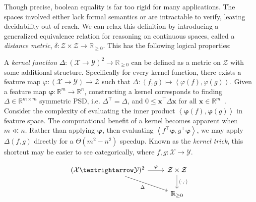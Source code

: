 \documentclass[11pt]{article}
\begin{document}
    Though precise, boolean equality is far too rigid for many applications. The spaces involved either lack formal semantics or are intractable to verify, leaving decidability out of reach. We can relax this definition by introducing a generalized equivalence relation for reasoning on continuous spaces, called a \textit{distance metric}, $δ: \mathcal{Z}\times\mathcal{Z}\rightarrow\mathbb{R}_{\geq 0}$. This has the following logical properties:


    \noindent A \textit{kernel function} $Δ: (\mathcal{X}\rightarrow\mathcal{Y})^2\rightarrow \mathbb{R}_{\geq 0}$ can be defined as a metric on $\mathcal{Z}$ with some additional structure. Specifically for every kernel function, there exists a feature map $\varphi: (\mathcal{X}→\mathcal{Y}) → \mathcal{Z}$ such that $Δ: (f, g) \mapsto \left<\varphi(f), \varphi(g)\right>$. Given a feature map $\symbf\varphi: \mathbb{R}^m → \mathbb{R}^n$, constructing a kernel corresponds to finding $\Delta \in \mathbb{R}^{m \times m}$ symmetric PSD, i.e. $\Delta^\intercal = \Delta$, and $0 \leq \mathbf{x}^\intercal \Delta \mathbf{x}$ for all $\mathbf{x} \in \mathbb{R}^m$~\cite{mercer1909functions}. Consider the complexity of evaluating the inner product $\left<\symbf\varphi(f), \symbf\varphi(g)\right>$ in feature space. The computational benefit of a kernel becomes apparent when $m \ll n$. Rather than applying $\symbf\varphi$, then evaluating $\left<f^\intercal\symbf\varphi, g^\intercal\symbf\varphi\right>$, we may apply $\Delta(f, g)$ directly for a $\Theta(m^2 - n^2)$ speedup. Known as the \textit{kernel trick}, this shortcut may be easier to see categorically, where $f, g: \mathcal{X}→\mathcal{Y}$.

    \[\begin{tikzcd}
          (\mathcal{X→\mathcal{Y}})^2 \arrow{r}{\varphi} \arrow[labels=below left]{dr}{\Delta} & \mathcal{Z}\times\mathcal{Z} \arrow{d}{\left<\cdot, \cdot\right>} \\
          & \mathbb{R}_{\geq 0}
    \end{tikzcd}
    \]
\end{document}
